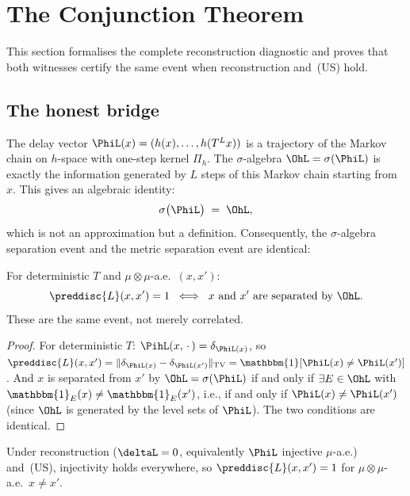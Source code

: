 \section{The Conjunction Theorem}
\label{III:sec:conjunction}

This section formalises the complete reconstruction diagnostic and proves
that both witnesses certify the same event when reconstruction and~(US) hold.

\subsection{The honest bridge}

The delay vector $\PhiL(x) = (h(x), \ldots, h(T^L x))$ is a trajectory of the
Markov chain on $h$-space with one-step kernel $\Pi_h$.
The $\sigma$-algebra $\OhL = \sigma(\PhiL)$ is exactly the information
generated by $L$ steps of this Markov chain starting from $x$.
This gives an algebraic identity:
\[
  \sigma\bigl(\PhiL\bigr) \;=\; \OhL,
\]
which is not an approximation but a definition.
Consequently, the $\sigma$-algebra separation event and the metric separation event
are identical:

\begin{lemma}
\label{III:lem:alg-metric}
For deterministic $T$ and $\mu \otimes \mu$-a.e.\ $(x, x')$:
\[
  \preddisc{L}(x,x') = 1
  \;\iff\;
  \text{$x$ and $x'$ are separated by $\OhL$.}
\]
These are the same event, not merely correlated.
\end{lemma}

\begin{proof}
For deterministic $T$:
$\PihL(x,\,\cdot\,) = \delta_{\PhiL(x)}$, so
$\preddisc{L}(x,x') = \|\delta_{\PhiL(x)} - \delta_{\PhiL(x')}\|_{\mathrm{TV}}
= \mathbbm{1}[\PhiL(x) \neq \PhiL(x')]$.
And $x$ is separated from $x'$ by $\OhL = \sigma(\PhiL)$ if and only if
$\exists E \in \OhL$ with $\mathbbm{1}_E(x) \neq \mathbbm{1}_E(x')$, i.e.,
if and only if $\PhiL(x) \neq \PhiL(x')$ (since $\OhL$ is generated by the
level sets of $\PhiL$).
The two conditions are identical.
\end{proof}

Under reconstruction ($\deltaL = 0$, equivalently $\PhiL$ injective $\mu$-a.e.)
and~(US), injectivity holds everywhere, so $\preddisc{L}(x,x') = 1$ for
$\mu \otimes \mu$-a.e.\ $x \neq x'$.

